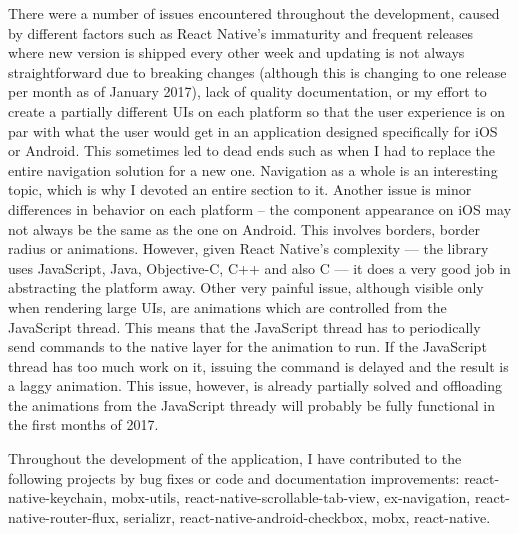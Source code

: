 There were a number of issues encountered throughout the development, caused by different factors such as React Native's immaturity and frequent releases where new version is shipped every other week and updating is not always straightforward due to breaking changes (although this is changing to one release per month as of January 2017), lack of quality documentation, or my effort to create a partially different UIs on each platform so that the user experience is on par with what the user would get in an application designed specifically for iOS or Android. This sometimes led to dead ends such as when I had to replace the entire navigation solution for a new one. Navigation as a whole is an interesting topic, which is why I devoted an entire section to it.
Another issue is minor differences in behavior on each platform -- the component appearance on iOS may not always be the same as the one on Android. This involves borders, border radius or animations. However, given React Native's complexity --- the library uses JavaScript, Java, Objective-C, C++ and also C --- it does a very good job in abstracting the platform away.
Other very painful issue, although visible only when rendering large UIs, are animations which are controlled from the JavaScript thread. This means that the JavaScript thread has to periodically send commands to the native layer for the animation to run. If the JavaScript thread has too much work on it, issuing the command is delayed and the result is a laggy animation. This issue, however, is already partially solved and offloading the animations from the JavaScript thready will probably be fully functional in the first months of 2017. 

Throughout the development of the application, I have contributed to the following projects by bug fixes or code and documentation improvements: react-native-keychain, mobx-utils, react-native-scrollable-tab-view, ex-navigation, react-native-router-flux, serializr, react-native-android-checkbox, mobx, react-native. 




